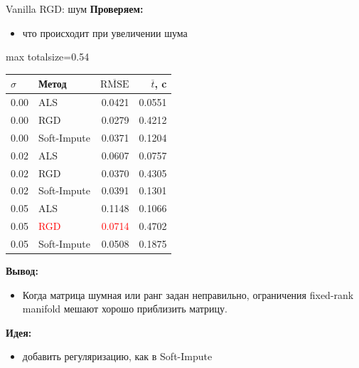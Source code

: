 \documentclass[aspectratio=169,xcolor=dvipsnames]{beamer}
\begin{document}
\begin{frame}{Vanilla RGD: шум}
\scriptsize
\textbf{Проверяем:}
\begin{itemize}
\item что происходит при увеличении шума
\end{itemize}

\begin{center}
\begin{adjustbox}{max totalsize={\textwidth}{0.54\textheight}}
\begin{tabular}{llrr}
\toprule
$\sigma$ & Метод & $\overline{\mathrm{RMSE}}$ & $\overline{t}$, c \\
\midrule
0.00 & ALS & 0.0421 & 0.0551 \\
0.00 & RGD & 0.0279 & 0.4212 \\
0.00 & Soft-Impute & 0.0371 & 0.1204 \\
\midrule
0.02 & ALS & 0.0607 & 0.0757 \\
0.02 & RGD & 0.0370 & 0.4305 \\
0.02 & Soft-Impute & 0.0391 & 0.1301 \\
\midrule
0.05 & ALS & 0.1148 & 0.1066 \\
0.05 & \textcolor{red}{RGD} & \textcolor{red}{0.0714} & 0.4702 \\
0.05 & \textcolor{green!50!black}{Soft-Impute} & \textcolor{green!50!black}{0.0508} & 0.1875 \\
\bottomrule
\end{tabular}
\end{adjustbox}
\end{center}

\textbf{Вывод:}
\begin{itemize}
\item Когда матрица шумная или ранг задан неправильно, ограничения fixed-rank manifold мешают хорошо приблизить матрицу.
\end{itemize}

\textbf{Идея:}
\begin{itemize}
\item добавить регуляризацию, как в Soft-Impute
\end{itemize}
\end{frame}
\end{document}
